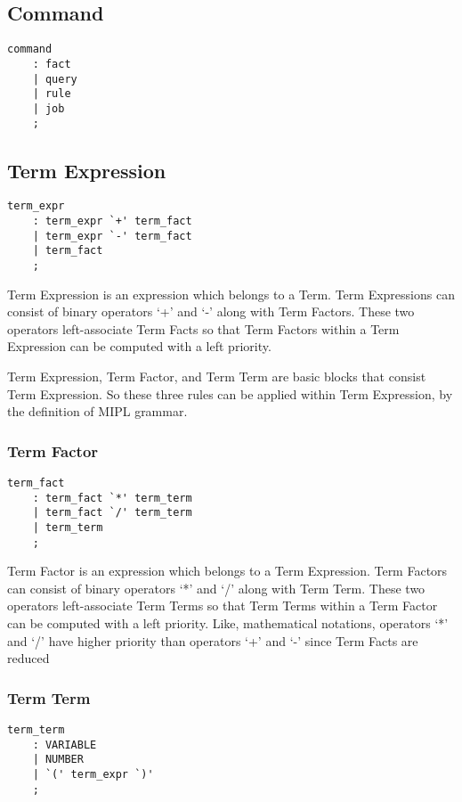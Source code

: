 \documentclass[prodmode,acmtecs]{acmsmall}
\begin{document}
\subsection{Command}

\begin{lstlisting}
command
	: fact
	| query
	| rule
	| job
	;
\end{lstlisting}


\subsection{Term Expression}
\begin{lstlisting}
term_expr
	: term_expr `+' term_fact
	| term_expr `-' term_fact
	| term_fact
	;
\end{lstlisting}

Term Expression is an expression which belongs to a Term.  Term 
Expressions can consist of binary operators `+' and `-' along with Term
Factors.  These two operators left-associate Term Facts so that Term
Factors within a Term Expression can be computed with a left priority.

Term Expression, Term Factor, and Term Term are basic blocks that
consist Term Expression.  So these three rules can be applied within
Term Expression, by the definition of MIPL grammar.

\subsubsection{Term Factor}

\begin{lstlisting}
term_fact
	: term_fact `*' term_term
	| term_fact `/' term_term
	| term_term
	;
\end{lstlisting}

Term Factor is an expression which belongs to a Term Expression.  Term 
Factors can consist of binary operators `*' and `/' along with Term
Term.  These two operators left-associate Term Terms so that Term
Terms within a Term Factor can be computed with a left priority. Like,
mathematical notations, operators `*' and `/' have higher priority than
operators `+' and `-' since Term Facts are reduced 


\subsubsection{Term Term}
\begin{lstlisting}
term_term
	: VARIABLE
	| NUMBER
	| `(' term_expr `)'
	;
\end{lstlisting}
\end{document}
